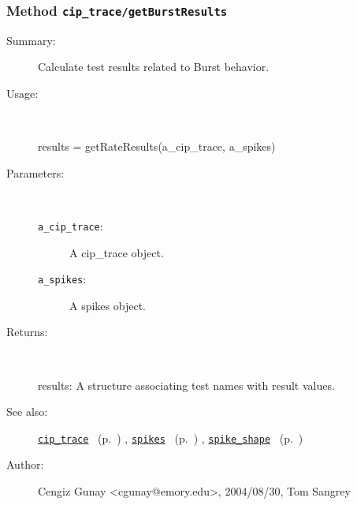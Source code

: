 \subsubsection[Method \texttt{getBurstResults}]{Method \texttt{cip\_trace/getBurstResults}}%
%
\label{ref_cip_trace__getBurstResults}%
\hypertarget{ref_cip_trace__getBurstResults}{}%
\begin{description}
\item[Summary:]Calculate test results related to Burst behavior.
%
\item[Usage:]~%
\begin{lyxcode}%
results = getRateResults(a\_cip\_trace, a\_spikes)
%
\end{lyxcode}%
%
%
\item[Parameters:]~
\begin{description}%
\item[\texttt{a\_cip\_trace}:]
 A cip\_trace object.
\item[\texttt{a\_spikes}:]
 A spikes object.
\end{description}%
%
\item[Returns:]~

	results: A structure associating test names with result values.
%
%
\item[See also:]%
\hyperlink{ref_cip_trace}{\texttt{cip\_trace}}%
\ (p.~\pageref{ref_cip_trace})%
%
, \hyperlink{ref_spikes}{\texttt{spikes}}%
\ (p.~\pageref{ref_spikes})%
%
, \hyperlink{ref_spike_shape}{\texttt{spike\_shape}}%
\ (p.~\pageref{ref_spike_shape})%
%
%
\item[Author:]%
Cengiz Gunay <cgunay@emory.edu>, 2004/08/30, Tom Sangrey%
\end{description}
\methodline%
